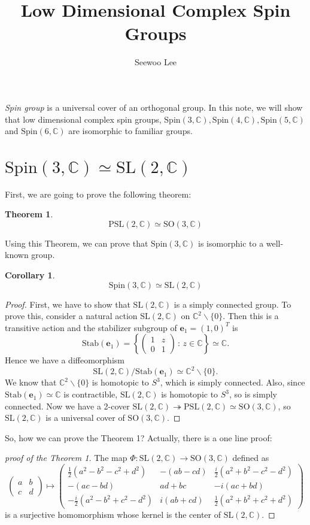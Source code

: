 \documentclass{article}
\title{Low Dimensional Complex Spin Groups}
\author{Seewoo Lee}
\newtheorem{theorem}{Theorem}
\newtheorem{corollary}{Corollary}
\newcommand{\PSL}{\mathrm{PSL}}
\newcommand{\SO}{\mathrm{SO}}
\newcommand{\SL}{\mathrm{SL}}
\newcommand{\Spin}{\mathrm{Spin}}
\newcommand{\Stab}{\mathrm{Stab}}
\begin{document}
\maketitle

\emph{Spin group} is a universal cover of an orthogonal group. In this note, we will show that low dimensional complex spin groups, $\Spin(3, \mathbb{C}), \Spin(4, \mathbb{C}), \Spin(5, \mathbb{C})$ and $\Spin(6, \mathbb{C})$ are isomorphic to familiar groups. 

\section{$\Spin(3, \mathbb{C})\simeq \SL(2, \mathbb{C})$} 
First, we are going to prove the following theorem:
\begin{theorem}
$$
\mathrm{PSL}(2, \mathbb{C}) \simeq \mathrm{SO}(3, \mathbb{C})
$$
\end{theorem}
Using this Theorem, we can prove that  $\Spin(3, \mathbb{C})$ is isomorphic to  a well-known group.
\begin{corollary}
$$
\Spin(3, \mathbb{C})\simeq \SL(2, \mathbb{C})
$$
\end{corollary}
\begin{proof}
First, we have to show that $\SL(2, \mathbb{C})$ is a simply connected group. 
To prove this, consider a natural action $\SL(2, \mathbb{C})$ on $\mathbb{C}^{2}\backslash \{0\}$. 
Then this is a transitive action and the stabilizer subgroup of $\mathbf{e}_{1} = (1, 0)^{T}$ is 
$$
\Stab(\mathbf{e}_{1}) = \left\{ \begin{pmatrix} 1& z \\ 0 & 1 \end{pmatrix}\,:\, z\in \mathbb{C}\right\} \simeq \mathbb{C}.
$$
Hence we have a diffeomorphism 
$$
\SL(2, \mathbb{C})/\Stab(\mathbf{e}_{1})\simeq \mathbb{C}^{2}\backslash\{0\}.
$$
We know that $\mathbb{C}^{2}\backslash \{0\}$ is homotopic to $S^{3}$, which is simply connected. 
Also, since $\Stab(\mathbf{e}_{1})\simeq \mathbb{C}$ is contractible,  $\SL(2, \mathbb{C})$ is homotopic to $S^{3}$, so is simply connected. 
Now we have a 2-cover $\SL(2, \mathbb{C})\twoheadrightarrow \PSL(2, \mathbb{C})\simeq \SO(3, \mathbb{C})$, so $\SL(2, \mathbb{C})$ is a universal cover of $\SO(3, \mathbb{C})$. 
\end{proof}
So, how we can prove the Theorem 1? Actually, there is a one line proof:
\begin{proof}[proof of the Theorem 1]
The map $\Phi:\SL(2, \mathbb{C})\to \SO(3, \mathbb{C})$ defined as
$$
\begin{pmatrix}a&b\\c&d\end{pmatrix} \mapsto \begin{pmatrix} \frac{1}{2}(a^{2}-b^{2}-c^{2} + d^{2}) & -(ab-cd) & \frac{i}{2}(a^{2}+b^{2}-c^{2}-d^{2}) \\ -(ac-bd) & ad+bc & -i(ac+bd)  \\ 
-\frac{i}{2}(a^{2}-b^{2}+c^{2}-d^{2}) & i(ab+cd) & \frac{1}{2}(a^{2}+b^{2}+c^{2}+d^{2}) \end{pmatrix}
$$
is a surjective homomorphism whose kernel is the center of $\SL(2, \mathbb{C})$. 
\end{proof}
\end{document}
